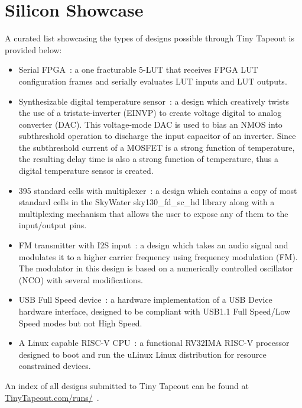 \section{Silicon Showcase}
\label{sec:silicon_showcase}

A curated list showcasing the types of designs possible through Tiny Tapeout is provided below:

\begin{itemize}
    \item Serial FPGA~\cite{showcaseserialfpga}: a one fracturable 5-LUT that receives FPGA LUT configuration frames and serially evaluates LUT inputs and LUT outputs.
    \item Synthesizable digital temperature sensor~\cite{showcasetempsense}: a design which creatively twists the use of a tristate-inverter (EINVP) to create voltage  digital to analog converter (DAC). This voltage-mode DAC is used to bias an NMOS into subthreshold operation to discharge the input capacitor of an inverter. Since the subthreshold current of a MOSFET is a strong function of temperature, the resulting delay time is also a strong function of temperature, thus a digital temperature sensor is created.
    \item 395 standard cells with multiplexer~\cite{showcasemicrotapeout}: a design which contains a copy of most standard cells in the SkyWater sky130\_fd\_sc\_hd library along with a multiplexing mechanism that allows the user to expose any of them to the input/output pins.
    \item FM transmitter with I2S input~\cite{showcasefmtx}: a design which takes an audio signal and modulates it to a higher carrier frequency using frequency modulation (FM). The modulator in this design is based on a numerically controlled oscillator (NCO) with several modifications.
    \item USB Full Speed device~\cite{showcaseusb}: a hardware implementation of a USB Device hardware interface, designed to be compliant with USB1.1 Full Speed/Low Speed modes but not High Speed.
    \item A Linux capable RISC-V CPU~\cite{showcasekianv}: a functional RV32IMA RISC-V processor designed to boot and run the uLinux Linux distribution for resource constrained devices.
\end{itemize}

An index of all designs submitted to Tiny Tapeout can be found at \url{TinyTapeout.com/runs/}~\cite{tinytapeoutruns}.
